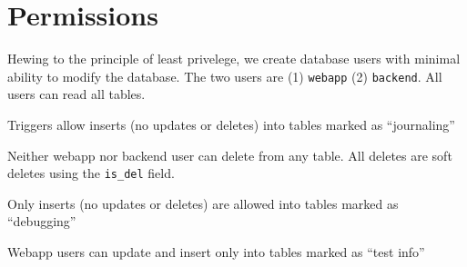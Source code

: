 \documentclass[letterpaper]{article}
\begin{document}
\section{Permissions}

Hewing to the principle of least privelege, we create database users with
minimal ability to modify the database.  The two users are (1) {\tt webapp} (2)
{\tt backend}. All users can read all tables.

\be
\item Triggers allow inserts (no updates or deletes) into tables marked as
  ``journaling''
\item 
Neither webapp nor backend user can delete from any table. All 
deletes are soft deletes using the {\tt is\_del} field. 
\item 
Only inserts (no updates or deletes) are allowed into tables marked as
``debugging'' 
\item 
Webapp users can update and insert only into tables marked as ``test info''
\item 
  \ee
\end{document}
